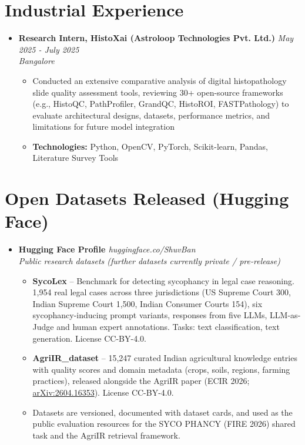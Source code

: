 \documentclass[a4paper,10pt]{article}
\newcommand{\resumeProject}[4]{
    \item\small{
        \textbf{#1} \hfill \textit{#2}\\
        \textit{#3}\\
        \begin{itemize}[leftmargin=1.5em,label=\textbullet,nosep,itemsep=0.5pt]
            #4
        \end{itemize}
    }\vspace{2pt}
}
\newcommand{\compactSection}[2]{
    \section{#1}
    \vspace{-0.1cm}
    #2
    \vspace{-0.2cm}
}
\begin{document}
\compactSection{Industrial Experience}{
\begin{itemize}[leftmargin=*,label={},itemsep=4pt]
    \resumeProject{Research Intern, HistoXai (Astroloop Technologies Pvt. Ltd.)}{May 2025 - July 2025}
    {Bangalore}
    {\item Conducted an extensive comparative analysis of digital histopathology slide quality assessment tools, reviewing 30+ open-source frameworks (e.g., HistoQC, PathProfiler, GrandQC, HistoROI, FASTPathology) to evaluate architectural designs, datasets, performance metrics, and limitations for future model integration
    \item \textbf{Technologies:} Python, OpenCV, PyTorch, Scikit-learn, Pandas, Literature Survey Tools}

\end{itemize}
}
\compactSection{Open Datasets Released (Hugging Face)}{
\begin{itemize}[leftmargin=*,label={},itemsep=4pt]

    \resumeProject{Hugging Face Profile \href{https://huggingface.co/ShuvBan}{\faDatabase}}{huggingface.co/ShuvBan}
    {Public research datasets (further datasets currently private / pre-release)}
    {\item \textbf{SycoLex} \href{https://huggingface.co/datasets/ShuvBan/SycoLex}{\faDatabase} -- Benchmark for detecting sycophancy in legal case reasoning. 1,954 real legal cases across three jurisdictions (US Supreme Court 300, Indian Supreme Court 1,500, Indian Consumer Courts 154), six sycophancy-inducing prompt variants, responses from five LLMs, LLM-as-Judge and human expert annotations. Tasks: text classification, text generation. License CC-BY-4.0.
    \item \textbf{AgriIR\_dataset} \href{https://huggingface.co/datasets/ShuvBan/AgriIR_dataset}{\faDatabase} -- 15,247 curated Indian agricultural knowledge entries with quality scores and domain metadata (crops, soils, regions, farming practices), released alongside the AgriIR paper (ECIR 2026; \href{https://arxiv.org/abs/2604.16353}{arXiv:2604.16353}). License CC-BY-4.0.
    \item Datasets are versioned, documented with dataset cards, and used as the public evaluation resources for the SYCO PHANCY (FIRE 2026) shared task and the AgriIR retrieval framework.}

\end{itemize}
}
\end{document}
